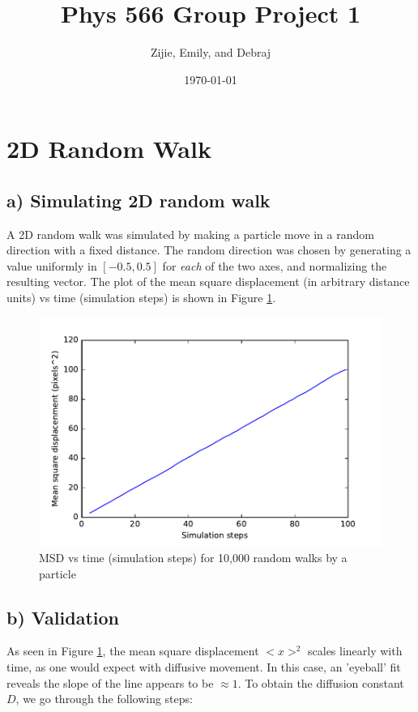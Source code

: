 \documentclass[a4paper]{article}
\title{Phys 566 Group Project 1}
\author{Zijie, Emily, and Debraj}
\date{\today}
\begin{document}
\maketitle

\section{2D Random Walk}



\subsection*{a) Simulating 2D random walk}

A 2D random walk was simulated by making a particle move in a random direction with a fixed distance. The random direction was chosen by generating a value uniformly in \( [-0.5,0.5] \) for \textit{each} of the two axes, and normalizing the resulting vector. The plot of the mean square displacement (in arbitrary distance units) vs time (simulation steps) is shown in Figure \ref{fig:2Drandomwalk}.

\begin{figure}[H]
\centering
\includegraphics[width=.7\linewidth]{2Drandomwalk.pdf}
\caption{MSD vs time (simulation steps) for 10,000 random walks by a particle}
\label{fig:2Drandomwalk}
\end{figure}


\subsection*{b) Validation}

As seen in Figure \ref{fig:2Drandomwalk}, the mean square displacement \( <x>^2 \) scales linearly with time, as one would expect with diffusive movement. In this case, an 'eyeball' fit reveals the slope of the line appears to be \( \approx 1  \). To obtain the diffusion constant \( D \), we go through the following steps: 
\end{document}
